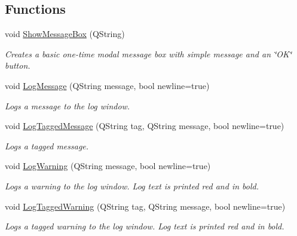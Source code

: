\subsection*{Functions}
\begin{DoxyCompactItemize}
\item 
\hypertarget{group___global_variables_ga656b53cad22b27c5acd1f7aea9f49c48}{void \hyperlink{group___global_variables_ga656b53cad22b27c5acd1f7aea9f49c48}{Show\-Message\-Box} (Q\-String)}\label{group___global_variables_ga656b53cad22b27c5acd1f7aea9f49c48}

\begin{DoxyCompactList}\small\item\em Creates a basic one-\/time modal message box with simple message and an \char`\"{}\-O\-K\char`\"{} button. \end{DoxyCompactList}\item 
void \hyperlink{group___global_variables_ga9bb2d01dee132ec096040ba459b4e2e4}{Log\-Message} (Q\-String message, bool newline=true)
\begin{DoxyCompactList}\small\item\em Logs a message to the log window. \end{DoxyCompactList}\item 
void \hyperlink{group___global_variables_ga577d74a77b480346d9aa74680d6e7020}{Log\-Tagged\-Message} (Q\-String tag, Q\-String message, bool newline=true)
\begin{DoxyCompactList}\small\item\em Logs a tagged message. \end{DoxyCompactList}\item 
void \hyperlink{group___global_variables_gabfd623074e3c2d311ca356321a5b839a}{Log\-Warning} (Q\-String message, bool newline=true)
\begin{DoxyCompactList}\small\item\em Logs a warning to the log window. Log text is printed red and in bold. \end{DoxyCompactList}\item 
void \hyperlink{group___global_variables_ga9765b2cee902fd2d265b2ddc307aecb2}{Log\-Tagged\-Warning} (Q\-String tag, Q\-String message, bool newline=true)
\begin{DoxyCompactList}\small\item\em Logs a tagged warning to the log window. Log text is printed red and in bold. \end{DoxyCompactList}\end{DoxyCompactItemize}
